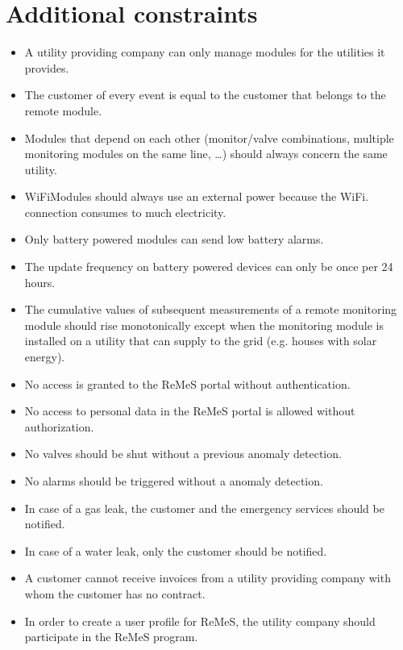 \chapter{Additional constraints}
\label{additional-constraints}

\begin{itemize}
	\item A utility providing company can only manage modules for the utilities it
	provides.
	\item The customer of every event is equal to the customer that belongs to the
	remote module.
	\item Modules that depend on each other (monitor/valve combinations, multiple
	monitoring modules on the same line, \ldots) should always concern the same
	utility.
	\item WiFiModules should always use an external power because the WiFi.
	connection consumes to much electricity.
	\item Only battery powered modules can send low battery alarms.
	\item The update frequency on battery powered devices can only be once per 24 hours. 
	\item The cumulative values of subsequent measurements of a remote
	monitoring module should rise monotonically except when the monitoring module
	is installed on a utility that can supply to the grid (e.g. houses with solar
	energy).
	\item No access is granted to the ReMeS portal without authentication.
	\item No access to personal data in the ReMeS portal is allowed without
	authorization.
	\item No valves should be shut without a previous anomaly detection.
	\item No alarms should be triggered without a anomaly detection.
	\item In case of a gas leak, the customer and the emergency services should be
	notified.
	\item In case of a water leak, only the customer should be notified.
	\item A customer cannot receive invoices from a utility providing company with
	whom the customer has no contract.
	\item In order to create a user profile for ReMeS, the utility company should
	participate in the ReMeS program.
\end{itemize}